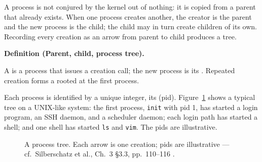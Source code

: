\documentclass[11pt]{article}
\newenvironment{definitionbox}[1]{%
  \par\noindent\textbf{Definition (#1).}\ \itshape
}{\par\vspace{0.3em}}
\begin{document}
A process is not conjured by the kernel out of nothing: it is copied from a
parent that already exists. When one process creates another, the creator is
the parent and the new process is the child; the child may in turn create
children of its own. Recording every creation as an arrow from parent to child
produces a tree.

\begin{definitionbox}{Parent, child, process tree}
A  is a process that issues a creation call; the new
process is its . Repeated creation forms a  rooted
at the first process.
\end{definitionbox}

Each process is identified by a unique integer, its 
(pid). Figure~\ref{fig:tree} shows a typical tree on a UNIX-like system: the
first process, \texttt{init} with pid 1, has started a login program, an SSH
daemon, and a scheduler daemon; each login path has started a shell; and one
shell has started \texttt{ls} and \texttt{vim}. The pids are illustrative.

\begin{figure}[h]
\centering
\caption{A process tree. Each arrow is one creation; pids are illustrative ---
cf.\ Silberschatz et al., Ch.~3 \S3.3, pp.~110--116
\cite{SilberschatzOSC_operating_system_concepts}.}
\label{fig:tree}
\end{figure}
\end{document}
